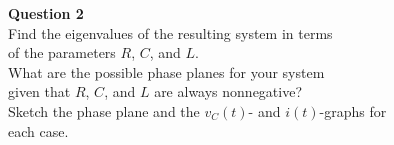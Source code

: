 \documentclass[preview]{standalone}
\begin{document}
\begin{center}
\raggedright
                    \textbf{Question 2} \\[10pt]
                    Find the eigenvalues of the resulting system in terms \\  
                    of the parameters $R$, $C$, and $L$. \\[5pt]
                    What are the possible phase planes for your system \\
                    given that $R$, $C$, and $L$ are always nonnegative? \\[5pt]
                    Sketch the phase plane and the $v_C(t)$- and $i(t)$-graphs for \\
                    each case.
\end{center}
\end{document}
